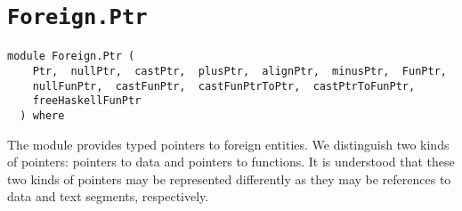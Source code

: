 \chapter{\texttt{Foreign.Ptr}}
\label{module:Foreign.Ptr}
\haddockbeginheader
{\haddockverb\begin{verbatim}
module Foreign.Ptr (
    Ptr,  nullPtr,  castPtr,  plusPtr,  alignPtr,  minusPtr,  FunPtr, 
    nullFunPtr,  castFunPtr,  castFunPtrToPtr,  castPtrToFunPtr, 
    freeHaskellFunPtr
  ) where\end{verbatim}}
\haddockendheader

The module  provides typed pointers to foreign
 entities.  We distinguish two kinds of pointers: pointers to data
 and pointers to functions.  It is understood that these two kinds
 of pointers may be represented differently as they may be
 references to data and text segments, respectively.
\par

